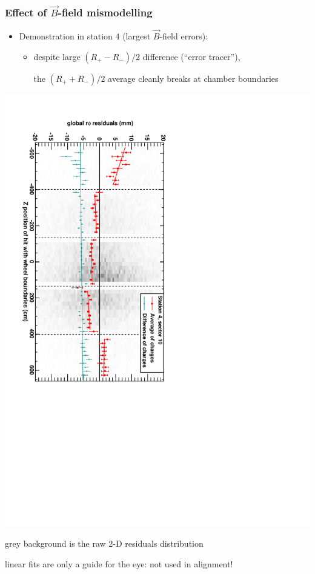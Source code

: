 \documentclass[compress]{beamer}
\begin{document}
\begin{frame}
\frametitle{Effect of $\vec{B}$-field mismodelling}
\begin{itemize}
\item Demonstration in station 4 (largest $\vec{B}$-field errors):
\begin{itemize}
\item despite large $(R_+ - R_-)/2$ difference (``error tracer''),

\vspace{0.2 cm}
the $(R_+ + R_-)/2$ average cleanly breaks at chamber boundaries
\end{itemize}
\end{itemize}

\includegraphics[height=\linewidth, angle=90]{demo_of_bfield.pdf}

\scriptsize grey background is the raw 2-D residuals distribution

linear fits are only a guide for the eye: not used in alignment!
\end{frame}


\end{document}
